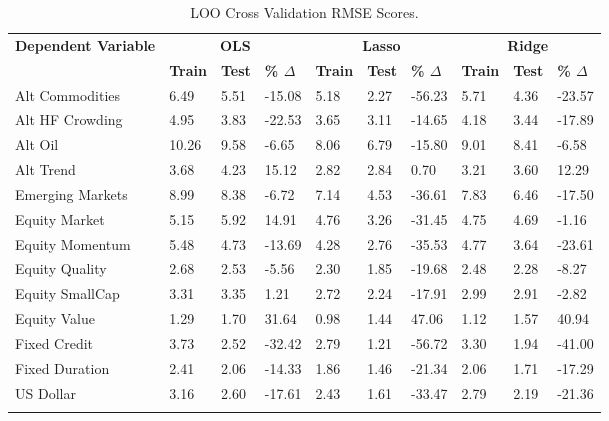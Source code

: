 \documentclass{ledger}
\begin{document}
\begin{table}[!ht]
	\centering
	\caption{LOO Cross Validation RMSE Scores. \label{table:loo_cross_validation}}
	\begin{tabularx}{\textwidth}{l *{9}{X}}
	\toprule
		\textbf{Dependent Variable} & \multicolumn{3}{c}{\textbf{OLS}} & \multicolumn{3}{c}{\textbf{Lasso}} & \multicolumn{3}{c}{\textbf{Ridge}} \\
	\cmidrule(lr){2-4} \cmidrule(lr){5-7} \cmidrule(lr){8-10}
			& \textbf{Train} & \textbf{Test} & \textbf{\% $\Delta$} & \textbf{Train} & \textbf{Test} & \textbf{\% $\Delta$} & \textbf{Train} & \textbf{Test} & \textbf{\% $\Delta$} \\
	\midrule
		Alt Commodities & 6.49 & 5.51 & -15.08 & 5.18 & 2.27 & -56.23 & 5.71 & 4.36 & -23.57 \\
		Alt HF Crowding & 4.95 & 3.83 & -22.53 & 3.65 & 3.11 & -14.65 & 4.18 & 3.44 & -17.89 \\
		Alt Oil & 10.26 & 9.58 & -6.65 & 8.06 & 6.79 & -15.80 & 9.01 & 8.41 & -6.58 \\
		Alt Trend & 3.68 & 4.23 & 15.12 & 2.82 & 2.84 & 0.70 & 3.21 & 3.60 & 12.29 \\
		Emerging Markets & 8.99 & 8.38 & -6.72 & 7.14 & 4.53 & -36.61 & 7.83 & 6.46 & -17.50 \\
		Equity Market & 5.15 & 5.92 & 14.91 & 4.76 & 3.26 & -31.45 & 4.75 & 4.69 & -1.16 \\
		Equity Momentum & 5.48 & 4.73 & -13.69 & 4.28 & 2.76 & -35.53 & 4.77 & 3.64 & -23.61 \\
		Equity Quality & 2.68 & 2.53 & -5.56 & 2.30 & 1.85 & -19.68 & 2.48 & 2.28 & -8.27 \\
		Equity SmallCap & 3.31 & 3.35 & 1.21 & 2.72 & 2.24 & -17.91 & 2.99 & 2.91 & -2.82 \\
		Equity Value & 1.29 & 1.70 & 31.64 & 0.98 & 1.44 & 47.06 & 1.12 & 1.57 & 40.94 \\
		Fixed Credit & 3.73 & 2.52 & -32.42 & 2.79 & 1.21 & -56.72 & 3.30 & 1.94 & -41.00 \\
		Fixed Duration & 2.41 & 2.06 & -14.33 & 1.86 & 1.46 & -21.34 & 2.06 & 1.71 & -17.29 \\
		US Dollar & 3.16 & 2.60 & -17.61 & 2.43 & 1.61 & -33.47 & 2.79 & 2.19 & -21.36 \\
	\bottomrule \\
	\end{tabularx}
\end{table}
\end{document}
